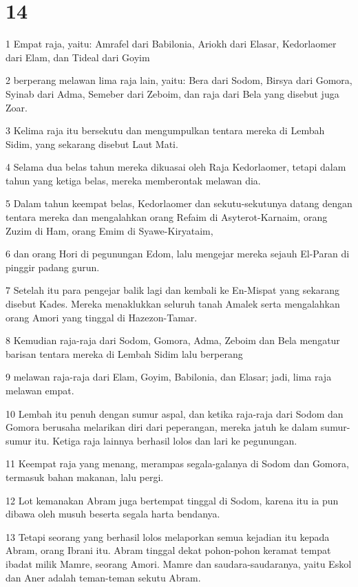\chapter{14}

\par 1 Empat raja, yaitu: Amrafel dari Babilonia, Ariokh dari Elasar, Kedorlaomer dari Elam, dan Tideal dari Goyim
\par 2 berperang melawan lima raja lain, yaitu: Bera dari Sodom, Birsya dari Gomora, Syinab dari Adma, Semeber dari Zeboim, dan raja dari Bela yang disebut juga Zoar.
\par 3 Kelima raja itu bersekutu dan mengumpulkan tentara mereka di Lembah Sidim, yang sekarang disebut Laut Mati.
\par 4 Selama dua belas tahun mereka dikuasai oleh Raja Kedorlaomer, tetapi dalam tahun yang ketiga belas, mereka memberontak melawan dia.
\par 5 Dalam tahun keempat belas, Kedorlaomer dan sekutu-sekutunya datang dengan tentara mereka dan mengalahkan orang Refaim di Asyterot-Karnaim, orang Zuzim di Ham, orang Emim di Syawe-Kiryataim,
\par 6 dan orang Hori di pegunungan Edom, lalu mengejar mereka sejauh El-Paran di pinggir padang gurun.
\par 7 Setelah itu para pengejar balik lagi dan kembali ke En-Mispat yang sekarang disebut Kades. Mereka menaklukkan seluruh tanah Amalek serta mengalahkan orang Amori yang tinggal di Hazezon-Tamar.
\par 8 Kemudian raja-raja dari Sodom, Gomora, Adma, Zeboim dan Bela mengatur barisan tentara mereka di Lembah Sidim lalu berperang
\par 9 melawan raja-raja dari Elam, Goyim, Babilonia, dan Elasar; jadi, lima raja melawan empat.
\par 10 Lembah itu penuh dengan sumur aspal, dan ketika raja-raja dari Sodom dan Gomora berusaha melarikan diri dari peperangan, mereka jatuh ke dalam sumur-sumur itu. Ketiga raja lainnya berhasil lolos dan lari ke pegunungan.
\par 11 Keempat raja yang menang, merampas segala-galanya di Sodom dan Gomora, termasuk bahan makanan, lalu pergi.
\par 12 Lot kemanakan Abram juga bertempat tinggal di Sodom, karena itu ia pun dibawa oleh musuh beserta segala harta bendanya.
\par 13 Tetapi seorang yang berhasil lolos melaporkan semua kejadian itu kepada Abram, orang Ibrani itu. Abram tinggal dekat pohon-pohon keramat tempat ibadat milik Mamre, seorang Amori. Mamre dan saudara-saudaranya, yaitu Eskol dan Aner adalah teman-teman sekutu Abram.
